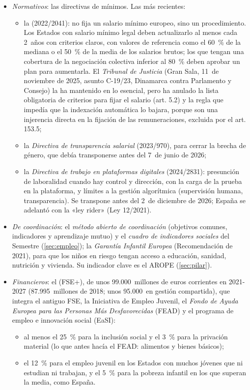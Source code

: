 \documentclass[11pt]{article}
\begin{document}
\begin{itemize}
\item \emph{Normativos}: las directivas de mínimos. Las más recientes:
  \begin{itemize}
  \item la  (2022/2041): no fija un salario mínimo europeo, sino un procedimiento. Los Estados con salario mínimo legal deben actualizarlo al menos cada 2~años con criterios claros, con valores de referencia como el 60~\% de la mediana o el 50~\% de la media de los salarios brutos; los que tengan una cobertura de la negociación colectiva inferior al 80~\% deben aprobar un plan para aumentarla\nocite{UE2022SalarioMinimo}. El \emph{Tribunal de Justicia} (Gran Sala, 11~de noviembre de 2025, asunto C-19/23, Dinamarca contra Parlamento y Consejo) la ha mantenido en lo esencial, pero ha anulado la lista obligatoria de criterios para fijar el salario (art. 5.2) y la regla que impedía que la indexación automática lo bajara, porque son una injerencia directa en la fijación de las remuneraciones, excluida por el art. 153.5\nocite{TJUE2025SalarioMinimo};
  \item la \emph{Directiva de transparencia salarial} (2023/970), para cerrar la brecha de género, que debía transponerse antes del 7~de junio de 2026;
  \item la \emph{Directiva de trabajo en plataformas digitales} (2024/2831): presunción de laboralidad cuando hay control y dirección, con la carga de la prueba en la plataforma, y límites a la gestión algorítmica (supervisión humana, transparencia). Se transpone antes del 2~de diciembre de 2026; España se adelantó con la «ley rider» (Ley 12/2021)\nocite{UE2024Plataformas}.
  \end{itemize}
\item \emph{De coordinación}: el \emph{método abierto de coordinación} (objetivos comunes, indicadores y aprendizaje mutuo) y el \emph{cuadro de indicadores sociales} del Semestre (\ref{sec:empleo}); la \emph{Garantía Infantil Europea} (Recomendación de 2021), para que los niños en riesgo tengan acceso a educación, sanidad, nutrición y vivienda. Su indicador clave es el AROPE (\ref{sec:pilar}).
\item \emph{Financieros}: el  (FSE+), de unos 99.000~millones de euros corrientes en 2021-2027 (87.995~millones de 2018; unos 95.000~en gestión compartida), que integra el antiguo FSE, la Iniciativa de Empleo Juvenil, el \emph{Fondo de Ayuda Europea para las Personas Más Desfavorecidas} (FEAD) y el programa de empleo e innovación social (EaSI)\nocite{UE2021FSE}:
  \begin{itemize}
  \item al menos el 25~\% para la inclusión social y el 3~\% para la privación material (lo que antes hacía el FEAD: alimentos y bienes básicos);
  \item el 12~\% para el empleo juvenil en los Estados con muchos jóvenes que ni estudian ni trabajan, y el 5~\% para la pobreza infantil en los que superan la media, como España.
  \end{itemize}
\end{itemize}
\end{document}
